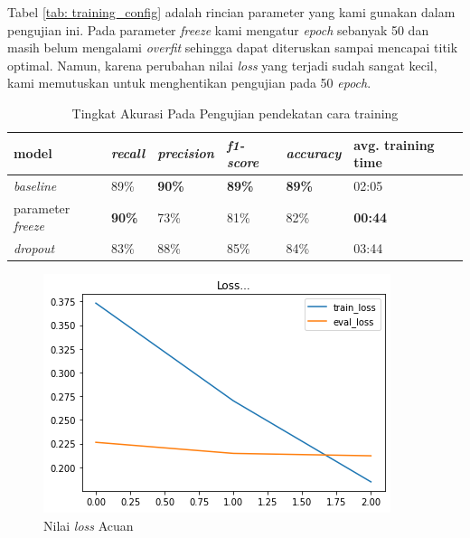 Tabel \ref{tab: training_config} adalah rincian parameter yang kami gunakan dalam pengujian ini. Pada parameter \textit{freeze} kami mengatur \textit{epoch} sebanyak 50 dan masih belum mengalami \textit{overfit} sehingga dapat diteruskan sampai mencapai titik optimal. Namun, karena perubahan nilai \textit{loss} yang terjadi sudah sangat kecil, kami memutuskan untuk menghentikan pengujian pada 50 \textit{epoch}.

\begin{table}[h]
    \centering
    \caption{Tingkat Akurasi Pada Pengujian pendekatan cara training}
    \label{tab: model_training_result}
    \begin{tabular}{|p{.12\linewidth}|l|l|l|l|p{.12\linewidth}|}
        \hline
        \textbf{model}            & \textit{\textbf{recall}} & \textit{\textbf{precision}} & \textit{\textbf{f1-score}} & \textit{\textbf{accuracy}} & \textbf{avg. training time} \\ \hline
        \textit{baseline}         & 89\%                     & \textbf{90\%}               & \textbf{89\%}              & \textbf{89\%}              & 02:05                       \\ \hline
        parameter \textit{freeze} & \textbf{90\%}            & 73\%                        & 81\%                       & 82\%                       & \textbf{00:44}              \\ \hline
        \textit{dropout}          & 83\%                     & 88\%                        & 85\%                       & 84\%                       & 03:44                       \\ \hline
    \end{tabular}
\end{table}

\begin{figure}[h]
    \begin{center}
        \includegraphics[width= 0.9\linewidth]{gambar/loss_concat_awal.png}
        \caption{Nilai \textit{loss} Acuan}
        \label{fig: loss_baseline}
    \end{center}
\end{figure}

